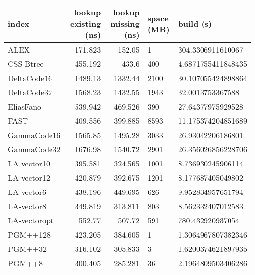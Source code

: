\begin{tabular}{lrrll}
\hline
 index             &   lookup existing (ns) &   lookup missing (ns) & space (MB)   & build (s)             \\
\hline
 ALEX              &                171.823 &               152.05  & 1            & 304.3306911610067     \\
 CSS-Btree         &                455.192 &               433.6   & 400          & 4.6871755411848435    \\
 DeltaCode16       &               1489.13  &              1332.44  & 2100         & 30.107055424898864    \\
 DeltaCode32       &               1568.23  &              1432.55  & 1943         & 32.0013753367588      \\
 EliasFano         &                539.942 &               469.526 & 390          & 27.64377975929528     \\
 FAST              &                409.556 &               399.885 & 8593         & 11.175374204851689    \\
 GammaCode16       &               1565.85  &              1495.28  & 3033         & 26.93042206186801     \\
 GammaCode32       &               1676.98  &              1540.72  & 2901         & 26.356026856228706    \\
 LA-vector10       &                395.581 &               324.565 & 1001         & 8.736930245906114     \\
 LA-vector12       &                420.879 &               392.675 & 1201         & 8.177687405049802     \\
 LA-vector6        &                438.196 &               449.695 & 626          & 9.952834957651794     \\
 LA-vector8        &                349.819 &               313.811 & 803          & 8.562332407012583     \\
 LA-vectoropt      &                552.77  &               507.72  & 591          & 780.432920937054      \\
 PGM++128          &                423.205 &               384.605 & 1            & 1.3064967807382346    \\
 PGM++32           &                316.102 &               305.833 & 3            & 1.6200374621897935    \\
 PGM++8            &                300.405 &               285.281 & 36           & 2.1964809503406286    \\

\end{tabular}
